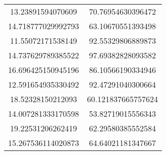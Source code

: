 \begin{table}
\begin{tabular}{cc}
13.23891594070609 & 70.76954630396472 \\
14.718777029992793 & 63.10670551393498 \\
11.55072171538149 & 92.55329806889873 \\
14.737629789385522 & 97.69382828093582 \\
16.696425150945196 & 86.10566190334946 \\
12.591654935330492 & 92.47291040300664 \\
18.52328150212093 & 60.121837665757624 \\
14.007281333170598 & 53.82719015556343 \\
19.22531206262419 & 62.29580385552584 \\
15.267536114020873 & 64.64021181347667 \\
\end{tabular}
\end{table}
